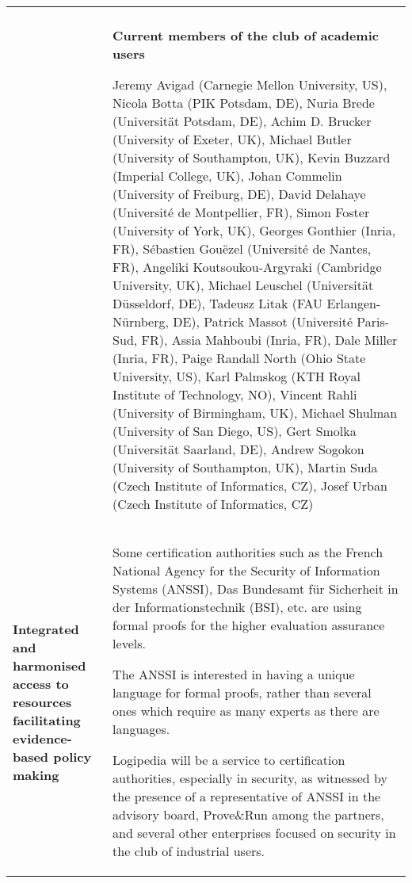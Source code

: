 \begin{longtable}{|p{}|p{}|}
\begin{compactitem}
\end{compactitem}
\\
&
\definecolor{shadecolor}{named}{color1}
\begin{shaded}
\begin{center}
  {\bf\large Current members of the club of academic users}
\end{center}
Jeremy Avigad (Carnegie Mellon University, US),
Nicola Botta (PIK Potsdam, DE),
Nuria Brede (Universität Potsdam, DE),
Achim D. Brucker (University of Exeter, UK),
Michael Butler (University of Southampton, UK),
Kevin Buzzard (Imperial College, UK),
Johan Commelin (University of Freiburg, DE),
David Delahaye (Université de Montpellier, FR),
Simon Foster (University of York, UK),
Georges Gonthier (Inria, FR),
Sébastien Gouëzel (Université de Nantes, FR),
Angeliki Koutsoukou-Argyraki (Cambridge University, UK),
Michael Leuschel (Universität Düsseldorf, DE),
Tadeusz Litak (FAU Erlangen-Nürnberg, DE),
Patrick Massot (Université Paris-Sud, FR),
Assia Mahboubi (Inria, FR),
Dale Miller (Inria, FR),
Paige Randall North (Ohio State University, US),
Karl Palmskog (KTH Royal Institute of Technology, NO),
Vincent Rahli (University of Birmingham, UK),
Michael Shulman (University of San Diego, US),
Gert Smolka (Universität Saarland, DE),
Andrew Sogokon (University of Southampton, UK),
Martin Suda (Czech Institute of Informatics, CZ),
Josef Urban (Czech Institute of Informatics, CZ)
\end{shaded}
\\
\hline {\bf Integrated and harmonised access to resources facilitating
  evidence-based policy making} & Some certification authorities such
as the French National Agency for the Security of Information Systems
(ANSSI), Das Bundesamt für Sicherheit in der Informationstechnik (BSI), etc.
are using formal proofs for the higher evaluation assurance levels. 

The ANSSI is interested in having a unique language for formal proofs,
rather than several ones which require as many experts as there are
languages.

Logipedia will be a service to certification authorities, especially
in security, as witnessed by the presence of a representative of ANSSI
in the advisory board, Prove\&Run among the partners, and several
other enterprises focused on security in the club of industrial users.


\end{longtable}
